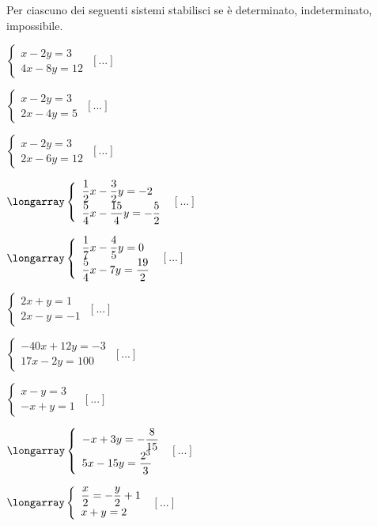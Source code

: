 \begin{esercizio}
 \label{ese:22.31}
Per ciascuno dei seguenti sistemi stabilisci se è determinato,
indeterminato, impossibile.
\begin{multicols}{2}
\begin{enumeratea}
\item \(\left\{\begin{array}{l}x-2y=3 \\4x-8y=12\end{array}\right.\)
 \hfill \(\left[...\right]\)
\item \(\left\{\begin{array}{l}x-2y=3 \\2x-4y=5\end{array}\right.\)
 \hfill \(\left[...\right]\)
\item \(\left\{\begin{array}{l}x-2y=3 \\2x-6y=12\end{array}\right.\)
 \hfill \(\left[...\right]\)
\item \(\longarray\left\{\begin{array}{l}
\dfrac{1}{2}x-\dfrac{3}{2}y=-2\\
\dfrac{5}{4}x-\dfrac{15}{4}y=-{\dfrac{5}{2}}\end{array}\right.\)
 \hfill \(\left[...\right]\)
\item \(\longarray\left\{\begin{array}{l}
\dfrac{1}{7}x-\dfrac{4}{5}y=0\\
\dfrac{5}{4}x-7y=\dfrac{19}{2}\end{array}\right.\)
 \hfill \(\left[...\right]\)
\item \(\left\{\begin{array}{l}2x+y=1 \\2x-y=-1\end{array}\right.\)
 \hfill \(\left[...\right]\)
\item \(\left\{\begin{array}{l}-40x+12y=-3\\17x-2y=100\end{array}\right.\)
 \hfill \(\left[...\right]\)
\item \(\left\{\begin{array}{l}x-y=3 \\-x+y=1 \end{array}\right.\)
 \hfill \(\left[...\right]\)
\item \(\longarray\left\{\begin{array}{l}
-x+3y=-{\dfrac{8}{15}}\\
5x-15y=\dfrac{2^{3}}{3}\end{array}\right.\)
 \hfill \(\left[...\right]\)
\item \(\longarray\left\{\begin{array}{l}
\dfrac{x}{2}=-{\dfrac{y}{2}}+1\\
x+y=2\end{array}\right.\)
 \hfill \(\left[...\right]\)
\end{enumeratea}
\end{multicols}
\end{esercizio}


